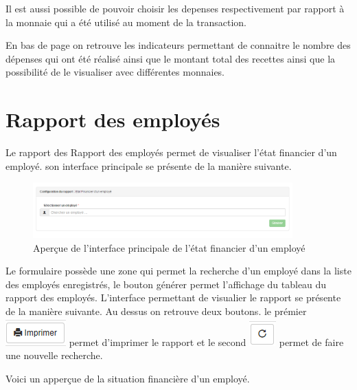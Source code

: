 \documentclass[12pt,a4paper]{report}
\begin{document}
Il est aussi possible de pouvoir choisir les depenses respectivement par rapport à la monnaie qui a été utilisé au moment de la transaction.

En bas de page on retrouve les indicateurs permettant de connaitre le nombre des dépenses qui ont été réalisé ainsi que le montant total des recettes ainsi que la possibilité de le visualiser avec différentes monnaies. 

\newpage
\section{Rapport des employés}
Le rapport des Rapport des employés permet de visualiser l'état financier d'un employé. son interface principale se présente de la manière suivante. 

\begin{figure}[h]
\begin{center}
\includegraphics[width=10cm]{pic/EtFinEMp.png}
\end{center}
\caption{Aperçue de l'interface principale de l'état financier d'un employé}
\label{Aperçue de l'interface principale de l'état financier d'un employé}
\end{figure}

Le formulaire possède une zone qui permet la recherche d'un employé dans la liste des employés enregistrés, le bouton générer permet l'affichage du tableau du rapport des employés. L'interface permettant de visualier le rapport se présente de la manière suivante. Au dessus on retrouve deux boutons. le prémier 
\includegraphics[scale=0.7]{pic/Print.png} permet d'imprimer le rapport et le second \includegraphics[scale=0.7]{pic/refresh.png} permet de faire une nouvelle recherche.

Voici un apperçue de la situation financière d'un employé.
\end{document}
